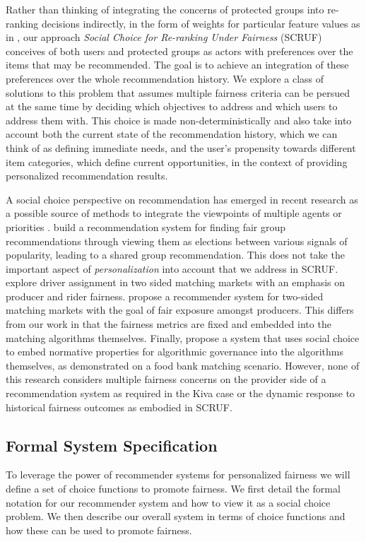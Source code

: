 Rather than thinking of integrating the concerns of protected groups into re-ranking decisions indirectly, in the form of weights for particular feature values as in \cite{sonboli-umap-2020}, our approach \textit{Social Choice for Re-ranking Under Fairness} (SCRUF) conceives of both users and protected groups as actors with preferences over the items that may be recommended. The goal is to achieve an integration of these preferences over the whole recommendation history. We explore a class of solutions to this problem that assumes multiple fairness criteria can be persued at the same time by deciding which objectives to address and which users to address them with.  This choice is made non-deterministically and also take into account both the current state of the recommendation history, which we can think of as defining immediate needs, and the user's propensity towards different item categories, which define current opportunities, in the context of providing personalized recommendation results. 

A social choice perspective on recommendation has emerged in recent research as a possible source of methods to integrate the viewpoints of multiple agents  or priorities \cite{burke2020algorithmic}. \cite{chakraborty2019equality} build a recommendation system for finding fair group recommendations through viewing them as elections between various signals of popularity, leading to a shared group recommendation.  This does not take the important aspect of \emph{personalization} into account that we address in SCRUF.  \cite{suhr2019two} explore driver assignment in two sided matching markets with an emphasis on producer and rider fairness. \cite{patro2020fairrec} propose a recommender system for two-sided matching markets with the goal of fair exposure amongst producers.  This differs from our work in that the fairness metrics are fixed and embedded into the matching algorithms themselves.  Finally, \cite{lee2019webuildai} propose a system that uses social choice to embed normative properties for algorithmic governance into the algorithms themselves, as demonstrated on a food bank matching scenario. However, none of this research considers multiple fairness concerns on the provider side of a recommendation system as required in the Kiva case or the dynamic response to historical fairness outcomes as embodied in SCRUF.


\subsection{Formal System Specification}
To leverage the power of recommender systems for personalized fairness we will define a set of choice functions to promote fairness. We first detail the formal notation for our recommender system and how to view it as a social choice problem. We then describe our overall system in terms of choice functions and how these can be used to promote fairness.

